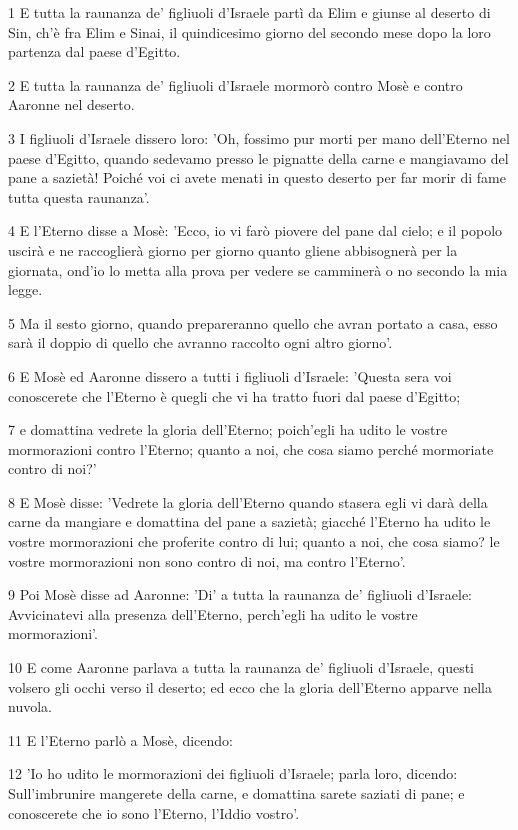 \par 1 E tutta la raunanza de' figliuoli d'Israele partì da Elim e giunse al deserto di Sin, ch'è fra Elim e Sinai, il quindicesimo giorno del secondo mese dopo la loro partenza dal paese d'Egitto.
\par 2 E tutta la raunanza de' figliuoli d'Israele mormorò contro Mosè e contro Aaronne nel deserto.
\par 3 I figliuoli d'Israele dissero loro: 'Oh, fossimo pur morti per mano dell'Eterno nel paese d'Egitto, quando sedevamo presso le pignatte della carne e mangiavamo del pane a sazietà! Poiché voi ci avete menati in questo deserto per far morir di fame tutta questa raunanza'.
\par 4 E l'Eterno disse a Mosè: 'Ecco, io vi farò piovere del pane dal cielo; e il popolo uscirà e ne raccoglierà giorno per giorno quanto gliene abbisognerà per la giornata, ond'io lo metta alla prova per vedere se camminerà o no secondo la mia legge.
\par 5 Ma il sesto giorno, quando prepareranno quello che avran portato a casa, esso sarà il doppio di quello che avranno raccolto ogni altro giorno'.
\par 6 E Mosè ed Aaronne dissero a tutti i figliuoli d'Israele: 'Questa sera voi conoscerete che l'Eterno è quegli che vi ha tratto fuori dal paese d'Egitto;
\par 7 e domattina vedrete la gloria dell'Eterno; poich'egli ha udito le vostre mormorazioni contro l'Eterno; quanto a noi, che cosa siamo perché mormoriate contro di noi?'
\par 8 E Mosè disse: 'Vedrete la gloria dell'Eterno quando stasera egli vi darà della carne da mangiare e domattina del pane a sazietà; giacché l'Eterno ha udito le vostre mormorazioni che proferite contro di lui; quanto a noi, che cosa siamo? le vostre mormorazioni non sono contro di noi, ma contro l'Eterno'.
\par 9 Poi Mosè disse ad Aaronne: 'Di' a tutta la raunanza de' figliuoli d'Israele: Avvicinatevi alla presenza dell'Eterno, perch'egli ha udito le vostre mormorazioni'.
\par 10 E come Aaronne parlava a tutta la raunanza de' figliuoli d'Israele, questi volsero gli occhi verso il deserto; ed ecco che la gloria dell'Eterno apparve nella nuvola.
\par 11 E l'Eterno parlò a Mosè, dicendo:
\par 12 'Io ho udito le mormorazioni dei figliuoli d'Israele; parla loro, dicendo: Sull'imbrunire mangerete della carne, e domattina sarete saziati di pane; e conoscerete che io sono l'Eterno, l'Iddio vostro'.
